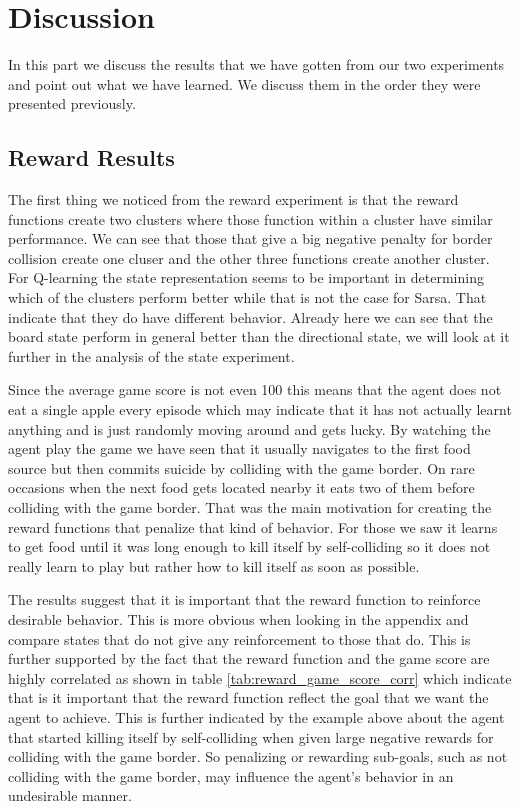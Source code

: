 \documentclass[result.tex]{subfiles}
\begin{document}
    \section*{\centering Discussion}

    In this part we discuss the results that we have gotten from our two experiments and point out what we have learned. We discuss them in the order they were presented previously.

    \subsection*{Reward Results}

    The first thing we noticed from the reward experiment is that the reward functions create two clusters where those function within a cluster have similar performance. We can see that those that give a big negative penalty for border collision create one cluser and the other three functions create another cluster. For Q-learning the state representation seems to be important in determining which of the clusters perform better while that is not the case for Sarsa. That indicate that they do have different behavior. Already here we can see that the board state perform in general better than the directional state, we will look at it further in the analysis of the state experiment.

    Since the average game score is not even 100 this means that the agent does not eat a single apple every episode which may indicate that it has not actually learnt anything and is just randomly moving around and gets lucky. By watching the agent play the game we have seen that it usually navigates to the first food source but then commits suicide by colliding with the game border. On rare occasions when the next food gets located nearby it eats two of them before colliding with the game border. That was the main motivation for creating the reward functions that penalize that kind of behavior. For those we saw it learns to get food until it was long enough to kill itself by self-colliding so it does not really learn to play but rather how to kill itself as soon as possible.

    The results suggest that it is important that the reward function to reinforce desirable behavior. This is more obvious when looking in the appendix and compare states that do not give any reinforcement to those that do. This is further supported by the fact that the reward function and the game score are highly correlated as shown in table \ref{tab:reward_game_score_corr} which indicate that is it important that the reward function reflect the goal that we want the agent to achieve. This is further indicated by the example above about the agent that started killing itself by self-colliding when given large negative rewards for colliding with the game border. So penalizing or rewarding sub-goals, such as not colliding with the game border, may influence the agent's behavior in an undesirable manner.
\end{document}
